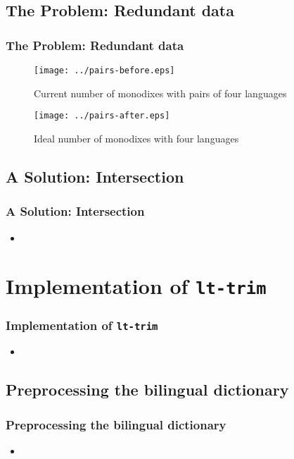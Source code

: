 \documentclass[notes=hide]{beamer}
\newcommand{\tool}[1]{\texttt{#1}}
\begin{document}
\subsection{The Problem: Redundant data}
\begin{frame}
  \frametitle{The Problem: Redundant data}

  \begin{figure}[h]
    \begin{center}
      \texttt{[image: ../pairs-before.eps]}
      \caption{Current number of monodixes with pairs of four languages}
      \label{fig:monodixes-current}
    \end{center}
  \end{figure}

  \begin{figure}[h]
    \begin{center}
      \texttt{[image: ../pairs-after.eps]}
      \caption{Ideal number of monodixes with four languages}
      \label{fig:monodixes-ideally}
    \end{center}
  \end{figure}

\end{frame}

\subsection{A Solution: Intersection}
\begin{frame}
  \frametitle{A Solution: Intersection}
  \begin{itemize}
  \item
  \end{itemize}
\end{frame}

\section{Implementation of \tool{lt-trim}}
\begin{frame}
  \frametitle{Implementation of \tool{lt-trim}}
  \begin{itemize}
  \item
  \end{itemize}
\end{frame}

\subsection{Preprocessing the bilingual dictionary}
\begin{frame}
  \frametitle{Preprocessing the bilingual dictionary}
  \begin{itemize}
  \item
  \end{itemize}
\end{frame}
\end{document}
